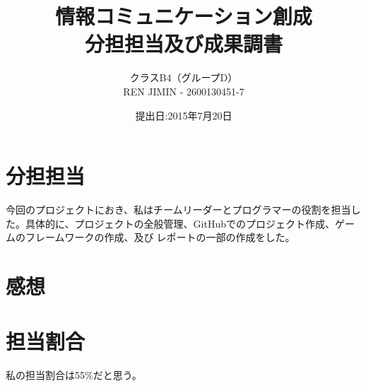 \documentclass{jarticle}
\title{情報コミュニケーション創成\\分担担当及び成果調書}
\author{クラスB4（グループD）\\REN JIMIN - 2600130451-7}
\date{提出日:2015年7月20日}
\begin{document}
\maketitle
	\section{分担担当}
		今回のプロジェクトにおき、私はチームリーダーとプログラマーの役割を担当した。具体的に、プロジェクトの全般管理、GitHubでのプロジェクト作成、ゲームのフレームワークの作成、及びレポートの一部の作成をした。
	\section{感想}
		
	\section{担当割合}
		私の担当割合は55\%だと思う。
\end{document}
